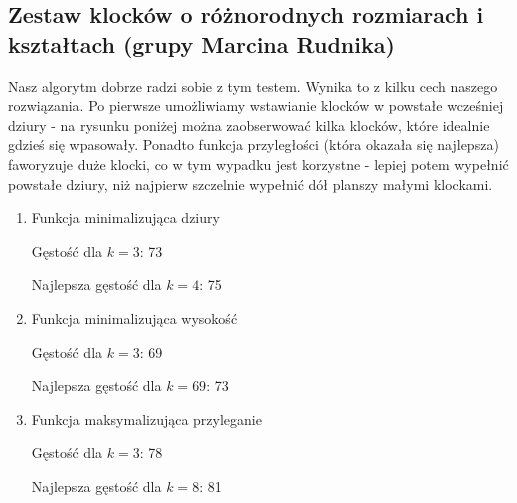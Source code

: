 \documentclass{article}
\begin{document}
\subsection{Zestaw klocków o różnorodnych rozmiarach i kształtach (grupy Marcina Rudnika)}
Nasz algorytm dobrze radzi sobie z tym testem. 
Wynika to z kilku cech naszego rozwiązania.
Po pierwsze umożliwiamy wstawianie klocków w powstałe wcześniej dziury - na rysunku poniżej można zaobserwować kilka klocków, które idealnie gdzieś się wpasowały.
Ponadto funkcja przyległości (która okazała się najlepsza) faworyzuje duże klocki, co w tym wypadku jest korzystne - lepiej potem wypełnić powstałe dziury, niż najpierw szczelnie wypełnić dół planszy małymi klockami.
\begin{enumerate}

\item Funkcja minimalizująca dziury

Gęstość dla $k=3$: 73

Najlepsza gęstość dla $k=4$: 75

\item Funkcja minimalizująca wysokość

Gęstość dla $k=3$: 69

Najlepsza gęstość dla $k=69$: 73

\item Funkcja maksymalizująca przyleganie

Gęstość dla $k=3$: 78

Najlepsza gęstość dla $k=8$: 81


\end{enumerate}
\end{document}
